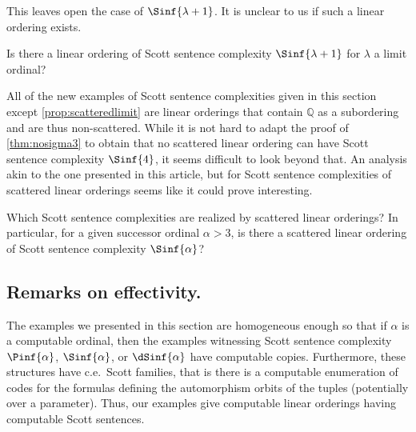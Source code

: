 \documentclass{amsart}
\newcommand{\Q}{\mathbb{Q}}
\begin{document}
This leaves open the case of $\Sinf{\lambda+1}$. It is unclear to us if
such a linear ordering exists.

\begin{question}\label{ques:lambda+1}
    Is there a linear ordering of Scott sentence complexity $\Sinf{\lambda+1}$
    for $\lambda$ a limit ordinal?
\end{question}

All of the new examples of Scott sentence complexities given in this section
except \cref{prop:scatteredlimit} are linear orderings that contain $\Q$ as a
subordering and are thus non-scattered. While it is not hard to adapt the proof
of \cref{thm:nosigma3} to obtain that no scattered linear ordering can have
Scott sentence complexity $\Sinf{4}$, it seems difficult to look beyond that. An
analysis akin to the one presented in this article, but for Scott sentence
complexities of scattered linear orderings seems like it could prove interesting.
\begin{question}\label{ques:scatteredlo}
    Which Scott sentence complexities are realized by scattered linear
    orderings? In particular, for a given successor ordinal $\alpha>3$, is there a scattered linear
    ordering of Scott sentence complexity $\Sinf{\alpha}$?
\end{question}

\subsection{Remarks on effectivity.}
The examples we presented in this section are homogeneous enough so that if
$\alpha$ is a computable ordinal, then the examples witnessing Scott sentence
complexity $\Pinf{\alpha}$, $\Sinf{\alpha}$, or $\dSinf{\alpha}$ have computable
copies. Furthermore, these structures have c.e.\ Scott families, that is there
is a computable enumeration of codes for the formulas defining the automorphism
orbits of the tuples (potentially over a parameter). Thus, our examples give
computable linear orderings having computable Scott sentences.
\end{document}
